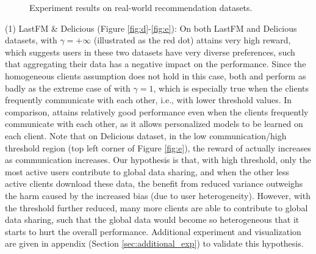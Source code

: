 \begin{figure}
\vspace{-2mm}
\caption{Experiment results on real-world recommendation datasets.}
\end{figure}

(1) LastFM \& Delicious (Figure \ref{fig:d}-\ref{fig:e}): 
On both LastFM and Delicious datasets, \modelone{} with $\gamma=+\infty$ (illustrated as the red dot) attains very high reward, which suggests users in these two datasets have very diverse preferences, such that aggregating their data has a negative impact on the performance. 
Since the homogeneous clients assumption does not hold in this case, both \modelone{} and \modelbaseline{} perform as badly as the extreme case of \modelone{} with $\gamma=1$, which is especially true when the clients frequently communicate with each other, i.e., with lower threshold values.
In comparison, \modeltwo{} attains relatively good performance even when the clients frequently communicate with each other, as it allows personalized models to be learned on each client. Note that on Delicious dataset, in the low communication/high threshold region (top left corner of Figure \ref{fig:e}), the reward of \modelone{} actually increases as communication increases. Our hypothesis is that, with high threshold, only the most active users contribute to global data sharing, and when the other less active clients download these data, the benefit from reduced variance outweighs the harm caused by the increased bias (due to user heterogeneity). However, with the threshold further reduced, many more clients are able to contribute to global data sharing, such that the global data would become so heterogeneous that it starts to hurt the overall performance. Additional experiment and visualization are given in appendix (Section \ref{sec:additional_exp}) to validate this hypothesis.

